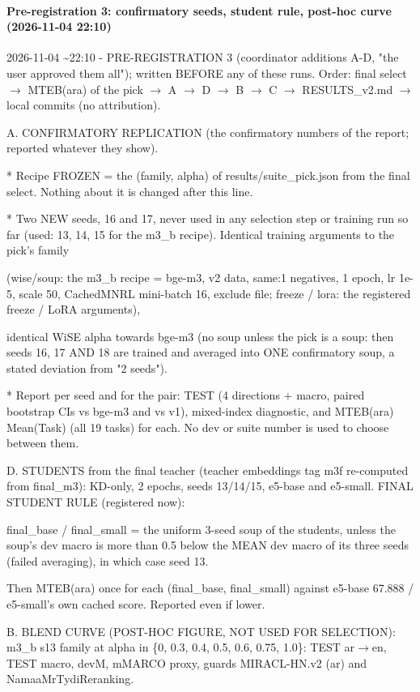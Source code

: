 \paragraph{Pre-registration 3: confirmatory seeds, student rule, post-hoc curve (2026-11-04 22:10)}
{\footnotesize\raggedright
2026-11-04 \textasciitilde{}22:10 - PRE-REGISTRATION 3 (coordinator additions A-D, "the user approved them all"); written BEFORE any of these runs. Order: final select $\to$ MTEB(ara) of the pick $\to$ A $\to$ D $\to$ B $\to$ C $\to$ RESULTS\_v2.md $\to$ local commits (no attribution).

A. CONFIRMATORY REPLICATION (the confirmatory numbers of the report; reported whatever they show).

* Recipe FROZEN = the (family, alpha) of results/suite\_pick.json from the final select. Nothing about it is changed after this line.

* Two NEW seeds, 16 and 17, never used in any selection step or training run so far (used: 13, 14, 15 for the m3\_b recipe). Identical training arguments to the pick's family

(wise/soup: the m3\_b recipe = bge-m3, v2 data, same:1 negatives, 1 epoch, lr 1e-5, scale 50, CachedMNRL mini-batch 16, exclude file; freeze / lora: the registered freeze / LoRA arguments),

identical WiSE alpha towards bge-m3 (no soup unless the pick is a soup: then seeds 16, 17 AND 18 are trained and averaged into ONE confirmatory soup, a stated deviation from "2 seeds").

* Report per seed and for the pair: TEST (4 directions + macro, paired bootstrap CIs vs bge-m3 and vs v1), mixed-index diagnostic, and MTEB(ara) Mean(Task) (all 19 tasks) for each. No dev or suite number is used to choose between them.

D. STUDENTS from the final teacher (teacher embeddings tag m3f re-computed from final\_m3): KD-only, 2 epochs, seeds 13/14/15, e5-base and e5-small. FINAL STUDENT RULE (registered now):

final\_base / final\_small = the uniform 3-seed soup of the students, unless the soup's dev macro is more than 0.5 below the MEAN dev macro of its three seeds (failed averaging), in which case seed 13.

Then MTEB(ara) once for each (final\_base, final\_small) against e5-base 67.888 / e5-small's own cached score. Reported even if lower.

B. BLEND CURVE (POST-HOC FIGURE, NOT USED FOR SELECTION): m3\_b s13 family at alpha in \{0, 0.3, 0.4, 0.5, 0.6, 0.75, 1.0\}: TEST ar$\to$en, TEST macro, devM, mMARCO proxy, guards MIRACL-HN.v2 (ar) and NamaaMrTydiReranking.

}
